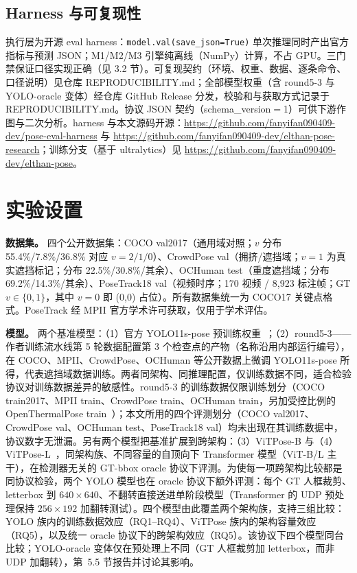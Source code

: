 \documentclass[10pt,conference]{IEEEtran}
\begin{document}
\subsection{Harness 与可复现性}

执行层为开源 eval harness：\texttt{model.val(save\_json=True)} 单次推理同时产出官方指标与预测 JSON；M1/M2/M3 引擎纯离线（NumPy）计算，不占 GPU。三门禁保证口径实现正确（见 3.2 节）。可复现契约（环境、权重、数据、逐条命令、口径说明）见仓库 REPRODUCIBILITY.md；全部模型权重（含 round5-3 与 YOLO-oracle 变体）经仓库 GitHub Release 分发，校验和与获取方式记录于 REPRODUCIBILITY.md。协议 JSON 契约（schema\_version$=$1）可供下游作图与二次分析。harness 与本文源码开源：\url{https://github.com/fanyifan090409-dev/pose-eval-harness} 与 \url{https://github.com/fanyifan090409-dev/elthan-pose-research}；训练分支（基于 ultralytics）见 \url{https://github.com/fanyifan090409-dev/elthan-pose}。

\section{实验设置}

\textbf{数据集。} 四个公开数据集：COCO val2017（通用域对照；$v$ 分布 55.4\%/7.8\%/36.8\% 对应 $v{=}2/1/0$）、CrowdPose val（拥挤/遮挡域；$v{=}1$ 为真实遮挡标记；分布 22.5\%/30.8\%/其余）、OCHuman test（重度遮挡域；分布 69.2\%/14.3\%/其余）、PoseTrack18 val（视频时序；170 视频 / 8,923 标注帧；GT $v\in\{0,1\}$，其中 $v{=}0$ 即 (0,0) 占位）。所有数据集统一为 COCO17 关键点格式。PoseTrack 经 MPII 官方学术许可获取，仅用于学术评估。

\textbf{模型。} 两个基准模型：（1）官方 YOLO11s-pose 预训练权重~\cite{14}；（2）round5-3——作者训练流水线第 5 轮数据配置第 3 个检查点的产物（名称沿用内部运行编号），在 COCO、MPII、CrowdPose、OCHuman 等公开数据上微调 YOLO11s-pose 所得，代表遮挡域数据训练。两者同架构、同推理配置，仅训练数据不同，适合检验协议对训练数据差异的敏感性。round5-3 的训练数据仅限训练划分（COCO train2017、MPII train、CrowdPose train、OCHuman train，另加受控比例的 OpenThermalPose train~\cite{18}）；本文所用的四个评测划分（COCO val2017、CrowdPose val、OCHuman test、PoseTrack18 val）均未出现在其训练数据中，协议数字无泄漏。另有两个模型把基准扩展到跨架构：（3）ViTPose-B 与（4）ViTPose-L~\cite{17}，同架构族、不同容量的自顶向下 Transformer 模型（ViT-B/L 主干），在检测器无关的 GT-bbox oracle 协议下评测。为使每一项跨架构比较都是同协议检验，两个 YOLO 模型也在 oracle 协议下额外评测：每个 GT 人框裁剪、letterbox 到 $640\times640$、不翻转直接送进单阶段模型（Transformer 的 UDP 预处理保持 $256\times192$ 加翻转测试）。四个模型由此覆盖两个架构族，支持三组比较：YOLO 族内的训练数据效应（RQ1--RQ4）、ViTPose 族内的架构容量效应（RQ5），以及统一 oracle 协议下的跨架构效应（RQ5）。该协议下四个模型同台比较；YOLO-oracle 变体仅在预处理上不同（GT 人框裁剪加 letterbox，而非 UDP 加翻转），第~5.5 节报告并讨论其影响。
\end{document}
